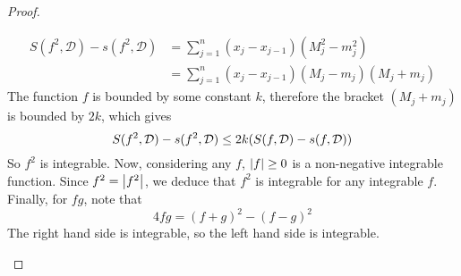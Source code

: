\begin{proof}
\begin{enumerate}[(1)]
\begin{align*}
			      S(f^2, \mathcal D) - s(f^2, \mathcal D) & = \sum_{j=1}^n (x_j - x_{j-1})(M_j^2 - m_j^2)        \\
			                                              & = \sum_{j=1}^n (x_j - x_{j-1})(M_j - m_j)(M_j + m_j)
		      \end{align*}
		      The function $f$ is bounded by some constant $k$, therefore the bracket $(M_j + m_j)$ is bounded by $2k$, which gives
		      \[ S(f^2, \mathcal D) - s(f^2, \mathcal D) \leq 2k\qty(S(f, \mathcal D) - s(f, \mathcal D)) \]
		      So $f^2$ is integrable. Now, considering any $f$, $\abs{f} \geq 0$ is a non-negative integrable function. Since $f^2 = \abs{f^2}$, we deduce that $f^2$ is integrable for any integrable $f$. Finally, for $fg$, note that
		      \[ 4fg = (f + g)^2 - (f - g)^2 \]
		      The right hand side is integrable, so the left hand side is integrable.
	\end{enumerate}
\end{proof}
